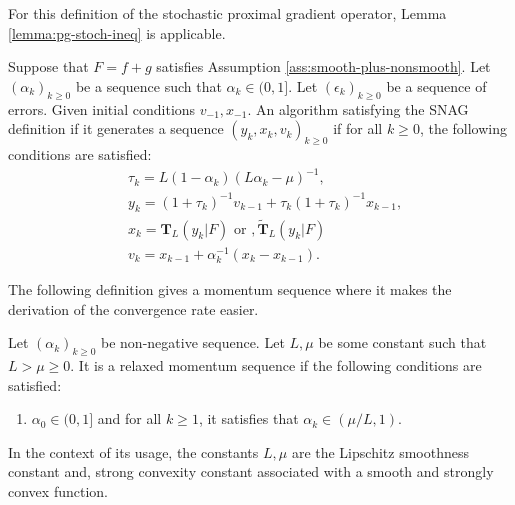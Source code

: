 \documentclass[12pt]{article}
\begin{document}
    \begin{remark}
        For this definition of the stochastic proximal gradient operator, Lemma \ref{lemma:pg-stoch-ineq} is applicable. 
    \end{remark}
    \begin{definition}\label{def:SNAG}
        Suppose that $F = f + g$ satisfies Assumption \ref{ass:smooth-plus-nonsmooth}. 
        Let $(\alpha_k)_{k \ge 0}$ be a sequence such that $\alpha_k \in (0, 1]$. 
        Let $(\epsilon_k)_{k \ge 0}$ be a sequence of errors. 
        Given initial conditions $v_{-1}, x_{- 1}$. 
        An algorithm satisfying the SNAG definition if it generates a sequence $(y_k, x_k, v_k)_{k \ge 0}$ if for all $k \ge 0$, the following conditions are satisfied: 
        \begin{align*}
            & \tau_k = L(1 - \alpha_k)\left(L \alpha_k - \mu\right)^{-1}, \\
            & y_k = (1 + \tau_k)^{-1}v_{k - 1} + \tau_k(1 + \tau_k)^{-1}x_{k - 1}, \\
            & x_k =  \mathbf T_{L}(y_k | F) \text{ or }, \mathbf{\widetilde T}_L(y_k | F)\\
            & v_k = x_{k - 1} + \alpha_k^{-1}(x_k - x_{k - 1}).
        \end{align*}
    \end{definition}
    The following definition gives a momentum sequence where it makes the derivation of the convergence rate easier. 
    \begin{definition}\label{def:relax-momen-seq}
        Let $(\alpha_k)_{k \ge 0}$ be non-negative sequence. 
        Let $L, \mu$ be some constant such that $L > \mu \ge 0$. 
        It is a relaxed momentum sequence if the following conditions are satisfied: 
        \begin{enumerate}[nosep]
            \item $\alpha_0 \in (0, 1]$ and for all $k \ge 1$, it satisfies that $\alpha_k \in (\mu/L, 1)$. 
        \end{enumerate}
    \end{definition}
    \begin{remark}
        In the context of its usage, the constants $L, \mu$ are the Lipschitz smoothness constant  and, strong convexity constant associated with a smooth and strongly convex function. 
    \end{remark}
\end{document}
